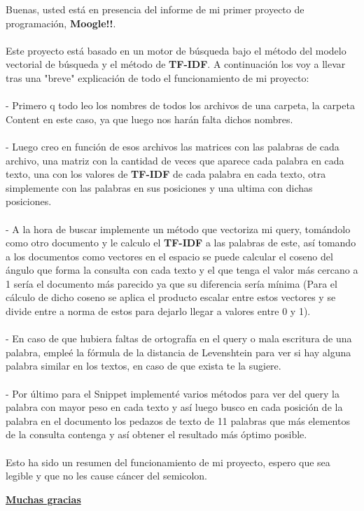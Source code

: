\documentclass{article}
\begin{document}
	
 \Large Buenas, usted está en presencia del informe de mi primer proyecto de programación, \textbf{Moogle!!}.\\
 \\
 \Large Este proyecto está basado en un motor de búsqueda bajo el método del modelo vectorial de búsqueda y el método de \textbf{TF-IDF}. A continuación los voy a llevar tras una "breve" explicación de todo el funcionamiento de mi proyecto:\\
 \\
 \Large - Primero q todo leo los nombres de todos los archivos de una carpeta, la carpeta Content en este caso, ya que luego nos harán falta dichos nombres.\\
 \\
 \Large - Luego creo en función de esos archivos las matrices con las palabras de cada archivo, una matriz con la cantidad de veces que aparece cada palabra en cada texto, una con los valores de \textbf{TF-IDF} de cada palabra en cada texto, otra simplemente con las palabras en sus posiciones y una ultima con dichas posiciones.\\
 \\
 \Large - A la hora de buscar implemente un método que vectoriza mi query, tomándolo como otro documento y le calculo el \textbf{TF-IDF} a las palabras de este, así tomando a los documentos como vectores en el espacio se puede calcular el coseno del ángulo que forma la consulta con cada texto y el que tenga el valor más cercano a 1 sería el documento más parecido ya que su diferencia sería mínima (Para el cálculo de dicho coseno se aplica el producto escalar entre estos vectores y se divide entre a norma de estos para dejarlo llegar a valores entre 0 y 1).\\
 \\
 \Large - En caso de que hubiera faltas de ortografía en el query o mala escritura de una palabra, empleé la fórmula de la distancia de Levenshtein para ver si hay alguna palabra similar en los textos, en caso de que exista te la sugiere.\\
 \\
 \Large - Por último para el Snippet implementé varios métodos para ver del query la palabra con mayor peso en cada texto y así luego busco en cada posición de la palabra en el documento los pedazos de texto de 11 palabras que más elementos de la consulta contenga y así obtener el resultado más óptimo posible.\\
 \\
 \Large Esto ha sido un resumen del funcionamiento de mi proyecto, espero que sea legible y que no les cause cáncer del semicolon.
 \\
 
 \begin{center}
 	\underline{\textbf{\huge Muchas gracias}}
 \end{center}
 
\end{document}
